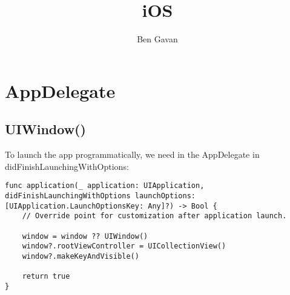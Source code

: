 \documentclass[]{article}
\title{iOS}
\author{Ben Gavan}
\begin{document}
\maketitle

\section{AppDelegate}
\subsection{UIWindow()}
To launch the app programmatically,  we need in the AppDelegate in didFinishLaunchingWithOptions:
\begin{lstlisting}
func application(_ application: UIApplication, didFinishLaunchingWithOptions launchOptions: [UIApplication.LaunchOptionsKey: Any]?) -> Bool {
	// Override point for customization after application launch.

	window = window ?? UIWindow()
	window?.rootViewController = UICollectionView()
	window?.makeKeyAndVisible()

	return true
}
\end{lstlisting}
\end{document}
